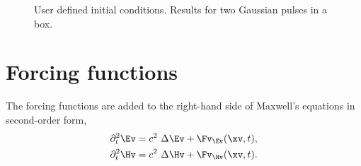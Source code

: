 \documentclass{article}
\begin{document}
{
\begin{figure}[hbt]
\newcommand{\figWidth}{5.5cm}
\newcommand{\trimfig}[2]{\trimFig{#1}{#2}{0.1}{0.05}{.05}{.05}}
\begin{center}
\end{center}
\caption{User defined initial conditions. Results for two Gaussian pulses in a box.}
\label{fig:userDefinedInitialConditionsGaussianPulses}
\end{figure}
}

\clearpage
\section{Forcing functions} \label{sec:forcings}

The forcing functions are added to the right-hand side of Maxwell's equations in
second-order form,
\begin{align}
  \partial_t^2 \Ev &= c^2~ \Delta \Ev  + \Fv_\Ev(\xv,t), \\
  \partial_t^2 \Hv &= c^2~ \Delta \Hv  + \Fv_\Hv(\xv,t).
\end{align}
\end{document}
